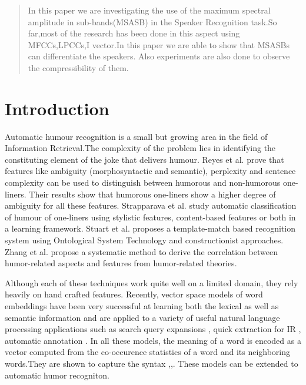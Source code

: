 \documentclass{acm_proc_article-sp}
\begin{document}
\renewcommand\Authands{ and }





\maketitle
\begin{abstract}
In this paper we are investigating the use of the maximum spectral amplitude in sub-bands(MSASB) in the Speaker Recognition task.So far,most of the research has been done in this aspect using MFCCs,LPCCs,I vector.In this paper we are able to show that MSASBs can differentiate the speakers. Also experiments are also done to observe the compressibility of them.


\end{abstract}





\section{Introduction}
Automatic humour recognition is a small but growing area in the field of Information Retrieval.The complexity of the problem lies in identifying the constituting element of the joke that delivers humour. Reyes et al. \cite{reyes2010evaluating} prove that features like ambiguity (morphosyntactic and semantic), perplexity and sentence complexity can be used to distinguish between humorous and non-humorous one-liners. Their results show that humorous one-liners show a higher degree of ambiguity for all these features. Strapparava et al.\cite{stock2006automatic} study automatic classification of humour of one-liners using stylistic features, content-based features or both in a learning framework. Stuart et al. \cite{stuart2012constructions} proposes a template-match based recognition system using Ontological System Technology and constructionist approaches. Zhang et al. \cite{zhang2014recognizing} propose a systematic method to derive the correlation between humor-related aspects and features from humor-related theories. 

Although each of these techniques work quite well on a limited domain, they rely heavily on hand crafted features. Recently, vector space models of word embeddings have been very successful at learning both the lexical as well as semantic information and are applied to a variety of useful natural language processing applications such as search query expansions \cite{jones2006generating}, quick extraction for IR \cite{pacsca2006names}, automatic annotation \cite{ratinov2011local}. In all these models, the meaning of a word is encoded as a vector computed from the co-occurence statistics of a word and its neighboring words.They are shown to capture the syntax \cite{mikolov2013efficient},\cite{huang2012improving},\cite{turian2010word}. These models can be extended to automatic humor recogniton. 
\end{document}
